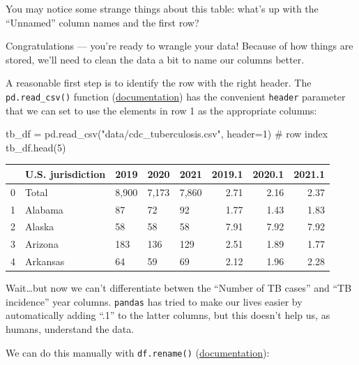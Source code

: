 \documentclass[
  letterpaper,
  DIV=11,
  numbers=noendperiod]{scrreprt}
\newenvironment{Shaded}{\begin{snugshade}}{\end{snugshade}}
\newcommand{\CommentTok}[1]{\textcolor[rgb]{0.37,0.37,0.37}{#1}}
\newcommand{\DecValTok}[1]{\textcolor[rgb]{0.68,0.00,0.00}{#1}}
\newcommand{\NormalTok}[1]{\textcolor[rgb]{0.00,0.23,0.31}{#1}}
\newcommand{\OperatorTok}[1]{\textcolor[rgb]{0.37,0.37,0.37}{#1}}
\newcommand{\StringTok}[1]{\textcolor[rgb]{0.13,0.47,0.30}{#1}}
\begin{document}
You may notice some strange things about this table: what's up with the
``Unnamed'' column names and the first row?

Congratulations --- you're ready to wrangle your data! Because of how
things are stored, we'll need to clean the data a bit to name our
columns better.

A reasonable first step is to identify the row with the right header.
The \texttt{pd.read\_csv()} function
(\href{https://pandas.pydata.org/docs/reference/api/pandas.read_csv.html}{documentation})
has the convenient \texttt{header} parameter that we can set to use the
elements in row 1 as the appropriate columns:

\begin{Shaded}
\begin{Highlighting}[]
\NormalTok{tb\_df }\OperatorTok{=}\NormalTok{ pd.read\_csv(}\StringTok{"data/cdc\_tuberculosis.csv"}\NormalTok{, header}\OperatorTok{=}\DecValTok{1}\NormalTok{) }\CommentTok{\# row index}
\NormalTok{tb\_df.head(}\DecValTok{5}\NormalTok{)}
\end{Highlighting}
\end{Shaded}

\begin{tabular}{lllllrrr}
\toprule
{} & U.S. jurisdiction &   2019 &   2020 &   2021 &  2019.1 &  2020.1 &  2021.1 \\
\midrule
0 &             Total &  8,900 &  7,173 &  7,860 &    2.71 &    2.16 &    2.37 \\
1 &           Alabama &     87 &     72 &     92 &    1.77 &    1.43 &    1.83 \\
2 &            Alaska &     58 &     58 &     58 &    7.91 &    7.92 &    7.92 \\
3 &           Arizona &    183 &    136 &    129 &    2.51 &    1.89 &    1.77 \\
4 &          Arkansas &     64 &     59 &     69 &    2.12 &    1.96 &    2.28 \\
\bottomrule
\end{tabular}

Wait\ldots but now we can't differentiate betwen the ``Number of TB
cases'' and ``TB incidence'' year columns. \texttt{pandas} has tried to
make our lives easier by automatically adding ``.1'' to the latter
columns, but this doesn't help us, as humans, understand the data.

We can do this manually with \texttt{df.rename()}
(\href{https://pandas.pydata.org/docs/reference/api/pandas.DataFrame.rename.html?highlight=rename\#pandas.DataFrame.rename}{documentation}):
\end{document}
